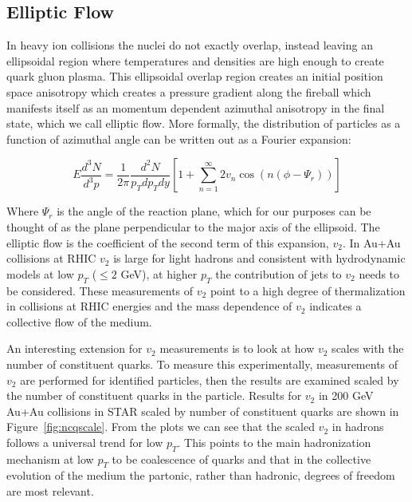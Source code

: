 \subsection{Elliptic Flow}

In heavy ion collisions the nuclei do not exactly overlap, instead leaving an ellipsoidal region where temperatures and densities are high enough to create quark gluon plasma. This ellipsoidal overlap region creates an initial position space anisotropy which creates a pressure gradient along the fireball which manifests itself as an momentum dependent azimuthal anisotropy in the final state, which we call elliptic flow. More formally, the distribution of particles as a function of azimuthal angle can be written out as a Fourier expansion:

\begin{equation}\label{eq:v2def}
E\frac{d^3N}{d^3p} = \frac{1}{2\pi}\frac{d^2N}{p_Tdp_Tdy}[1 + \sum_{n=1}^{\infty}2 v_n \cos(n(\phi - \Psi_r))]
\end{equation}

Where $\Psi_r$ is the angle of the reaction plane, which for our purposes can be thought of as the plane perpendicular to the major axis of the ellipsoid. The elliptic flow is the coefficient of the second term of this expansion, $v_2$. In Au+Au collisions at RHIC $v_2$ is large for light hadrons and consistent with hydrodynamic models at low $p_T$ ($\leq 2$ GeV), at higher $p_T$ the contribution of jets to $v_2$ needs to be considered. These measurements of $v_2$ point to a high degree of thermalization in collisions at RHIC energies and the mass dependence of $v_2$ indicates a collective flow of the medium.

An interesting extension for $v_2$ measurements is to look at how $v_2$ scales with the number of constituent quarks. To measure this experimentally, measurements of $v_2$ are performed for identified particles, then the results are examined scaled by the number of constituent quarks in the particle. Results for $v_2$ in 200 GeV Au+Au collisions in STAR scaled by number of constituent quarks are shown in Figure~\ref{fig:ncqscale}. From the plots we can see that the scaled $v_2$ in hadrons follows a universal trend for low $p_T$. This points to the main hadronization mechanism at low $p_T$ to be coalescence of quarks and that in the collective evolution of the medium the partonic, rather than hadronic, degrees of freedom are most relevant. 

